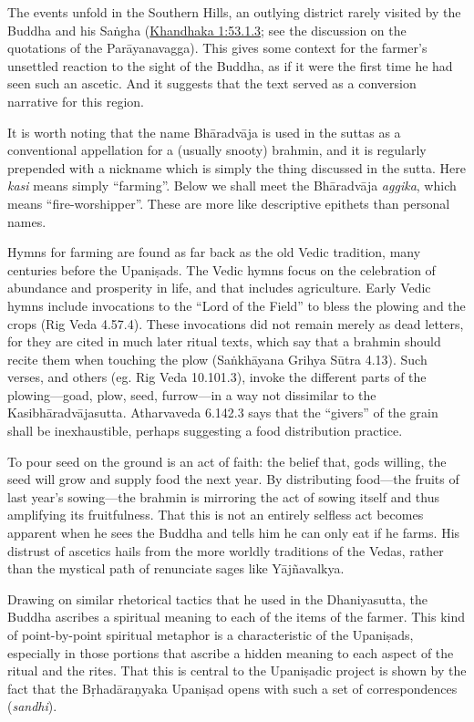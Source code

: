 \documentclass[12pt,openany]{book}%
\begin{document}
The events unfold in the Southern Hills, an outlying district rarely visited by the Buddha and his \textsanskrit{Saṅgha} (\href{https://suttacentral.net/pli-tv-kd1/en/brahmali\#53.1.3}{Khandhaka 1:53.1.3}; see the discussion on the quotations of the \textsanskrit{Parāyanavagga}). This gives some context for the farmer’s unsettled reaction to the sight of the Buddha, as if it were the first time he had seen such an ascetic. And it suggests that the text served as a conversion narrative for this region.

It is worth noting that the name \textsanskrit{Bhāradvāja} is used in the suttas as a conventional appellation for a (usually snooty) brahmin, and it is regularly prepended with a nickname which is simply the thing discussed in the sutta. Here \textit{kasi} means simply “farming”. Below we shall meet the \textsanskrit{Bhāradvāja} \textit{aggika}, which means “fire-worshipper”. These are more like descriptive epithets than personal names.

Hymns for farming are found as far back as the old Vedic tradition, many centuries before the \textsanskrit{Upaniṣads}. The Vedic hymns focus on the celebration of abundance and prosperity in life, and that includes agriculture. Early Vedic hymns include invocations to the “Lord of the Field” to bless the plowing and the crops (Rig Veda 4.57.4). These invocations did not remain merely as dead letters, for they are cited in much later ritual texts, which say that a brahmin should recite them when touching the plow (\textsanskrit{Saṅkhāyana} Grihya \textsanskrit{Sūtra} 4.13). Such verses, and others (eg. Rig Veda 10.101.3), invoke the different parts of the plowing—goad, plow, seed, furrow—in a way not dissimilar to the \textsanskrit{Kasibhāradvājasutta}. Atharvaveda 6.142.3 says that the “givers” of the grain shall be inexhaustible, perhaps suggesting a food distribution practice.

To pour seed on the ground is an act of faith: the belief that, gods willing, the seed will grow and supply food the next year. By distributing food—the fruits of last year’s sowing—the brahmin is mirroring the act of sowing itself and thus amplifying its fruitfulness. That this is not an entirely selfless act becomes apparent when he sees the Buddha and tells him he can only eat if he farms. His distrust of ascetics hails from the more worldly traditions of the Vedas, rather than the mystical path of renunciate sages like \textsanskrit{Yājñavalkya}.

Drawing on similar rhetorical tactics that he used in the Dhaniyasutta, the Buddha ascribes a spiritual meaning to each of the items of the farmer. This kind of point-by-point spiritual metaphor is a characteristic of the \textsanskrit{Upaniṣads}, especially in those portions that ascribe a hidden meaning to each aspect of the ritual and the rites. That this is central to the \textsanskrit{Upaniṣadic} project is shown by the fact that the \textsanskrit{Bṛhadāraṇyaka} \textsanskrit{Upaniṣad} opens with such a set of correspondences (\textit{sandhi}).
\end{document}
